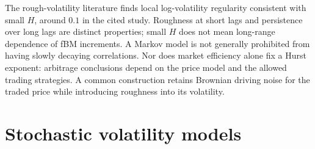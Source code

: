 The rough-volatility literature finds local log-volatility regularity consistent with small $H$, around $0.1$ in the cited study\cite{GatheralEtAl2018}.
Roughness at short lags and persistence over long lags are distinct properties; small $H$ does not mean long-range dependence of fBM increments.
A Markov model is not generally prohibited from having slowly decaying correlations.
Nor does market efficiency alone fix a Hurst exponent: arbitrage conclusions depend on the price model and the allowed trading strategies.
A common construction retains Brownian driving noise for the traded price while introducing roughness into its volatility.

\section{Stochastic volatility models}\label{sec:stoch-vol}

